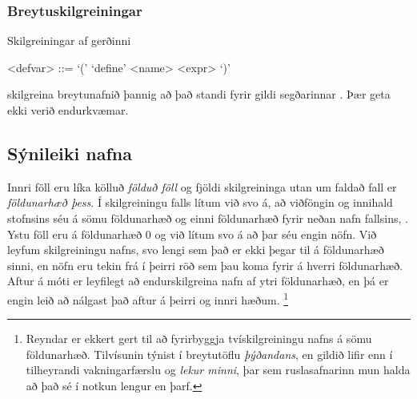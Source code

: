 \documentclass[a4paper,icelandic]{article}
\begin{document}
\subsubsection{Breytuskilgreiningar}
\label{sec:breytuskilgreiningar}
Skilgreiningar af gerðinni
\begin{grammar}
  <defvar> ::= `(' `define' <name> <expr> `)'
\end{grammar}
skilgreina breytunafnið  þannig að það standi fyrir gildi
segðarinnar . Þær geta ekki verið endurkvæmar.

\subsection{Sýnileiki nafna}
\label{sec:synileiki-nafna}

Innri föll eru líka kölluð \emph{földuð föll} og fjöldi skilgreininga
utan um faldað fall er \emph{földunarhæð þess}. Í skilgreiningu falls
lítum við svo á, að viðföngin  og innihald stofnsins
 séu á sömu földunarhæð og einni földunarhæð fyrir neðan
nafn fallsins, . Ystu föll eru á földunarhæð 0 og við lítum
svo á að þar séu engin nöfn. Við leyfum skilgreiningu nafns, svo lengi
sem það er ekki þegar til á földunarhæð sinni, en nöfn eru tekin frá í
þeirri röð sem þau koma fyrir á hverri földunarhæð. Aftur á móti er
leyfilegt að endurskilgreina nafn af ytri földunarhæð, en þá er engin
leið að nálgast það aftur á þeirri og innri hæðum. \footnote{Reyndar
  er ekkert gert til að fyrirbyggja tvískilgreiningu nafns á sömu
  földunarhæð. Tilvísunin týnist í breytutöflu \emph{þýðandans}, en
  gildið lifir enn í tilheyrandi vakningarfærslu og \emph{lekur minni},
  þar sem ruslasafnarinn mun halda að það sé í notkun lengur en þarf.}
\end{document}
